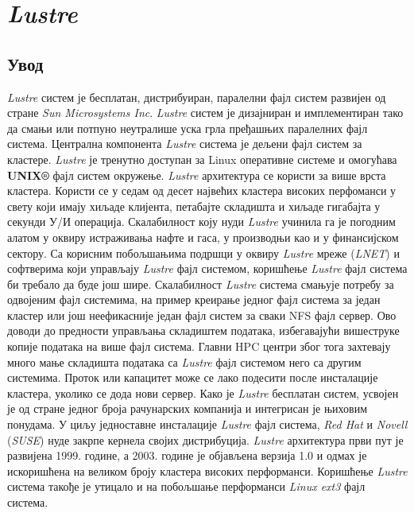 \chapter{ \textit{Lustre} }
\section{Увод}

\textit{Lustre}   систем је бесплатан, дистрибуиран, паралелни фајл систем развијен од стране \textit{Sun Microsystems Inc}.  \textit{Lustre}  систем је дизајниран и имплементиран тако да смањи  или потпуно неутралише уска грла пређашњих паралелних фајл система. Централна компонента   \textit{Lustre}  система је дељени фајл систем за кластере.  \textit{Lustre}  је тренутно доступан за Linux оперативне системе и омогућава \textbf{UNIX®} фајл систем окружење.  \textit{Lustre}  архитектура се користи за више врста кластера. Користи се у седам од десет највећих кластера високих перфоманси у свету који имају хиљаде клијента, петабајте складишта и хиљаде  гигабајта у секунди У/И операција. Скалабилност коју нуди   \textit{Lustre}  учинила га је погодним алатом у оквиру истраживања нафте и гаса, у производњи као и у финансијском сектору. Са корисним побољшањима подршци у оквиру  \textit{Lustre}  мреже (\textit{LNET}) и софтверима који управљају  \textit{Lustre}  фајл системом, коришћење  \textit{Lustre}  фајл система би требало да буде још шире. Скалабилност   \textit{Lustre}  система смањује потребу за одвојеним фајл системима, на пример креирање једног фајл система за један кластер или још неефикасније један фајл систем за сваки \gls{NFS} фајл сервер. Ово доводи до предности управљања складиштем података, избегавајући вишеструке копије података на више фајл система. Главни  \gls{HPC} центри због тога захтевају много мање складишта података са   \textit{Lustre}  фајл системом него са другим системима. Проток или капацитет може се лако подесити после инсталације кластера, уколико се дода нови сервер. Како је   \textit{Lustre}  бесплатан систем, усвојен је од стране једног броја рачунарских компанија и интегрисан је њиховим понудама. У циљу једноставне инсталације   \textit{Lustre}  фајл система, \textit{Red Hat} и \textit{Novell} (\textit{SUSE}) нуде закрпе кернела својих дистрибуција.  \textit{Lustre}  архитектура први пут је развијена 1999. године, а 2003. године је објављена верзија 1.0 и одмах је искоришћена на великом броју кластера високих перформанси. Коришћење   \textit{Lustre}  система такође је утицало и на побољшање перформанси \textit{Linux ext3} фајл система.


